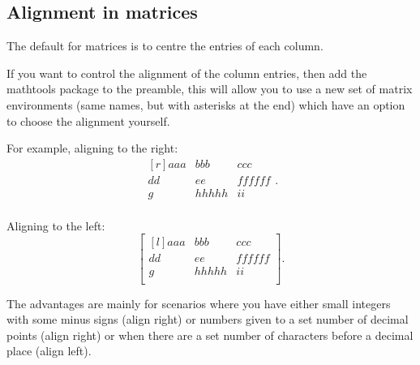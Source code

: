 \documentclass[a4paper,11pt]{article}
\begin{document}
\subsection{Alignment in matrices}

The default for matrices is to centre the entries of each column. 

If you want to control the alignment of the column entries, then add the mathtools package to the preamble, this will allow you to use a new set of matrix environments (same names, but with asterisks at the end) which have an option to choose the alignment yourself.
  
For example, aligning to the right:
\[ 
\begin{matrix*}[r] 			%
 	aaa & bbb   & ccc \\ 
 	dd  & ee    & ffffff \\
 	g   & hhhhh & ii \\
\end{matrix*}.
\]

Aligning to the left:
\[ 
\begin{bmatrix*}[l] 		%
 	aaa & bbb   & ccc \\ 
 	dd  & ee    & ffffff \\
 	g   & hhhhh & ii \\
 \end{bmatrix*}.
\]

The advantages are mainly for scenarios where you have either small integers with some minus signs (align right) or numbers given to a set number of decimal points (align right) or when there are a set number of characters before a decimal place (align left).
\end{document}
